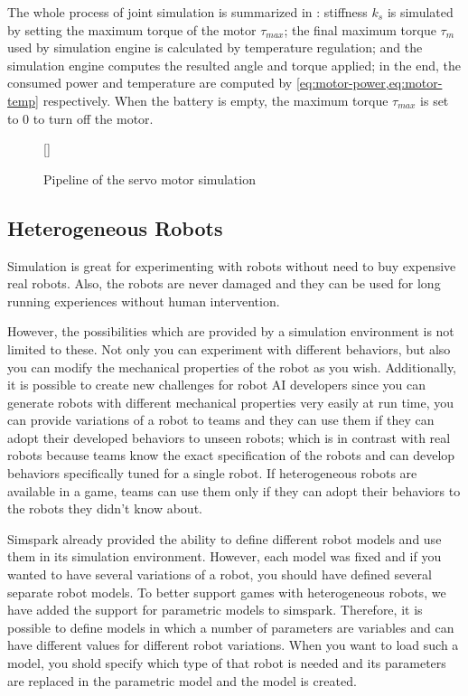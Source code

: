 \documentclass{llncs}
\newcommand{\inputtikz}[1]
{
  \StrSubstitute{#1}{/}{.}[\fn]
  \scancs{\filename}{\fn}
  \tikzsetfigurename{\filename}
  
}
\begin{document}
The whole process of joint simulation is summarized in
: stiffness $k_s$ is simulated by setting the maximum torque
of the motor $\tau_{max}$; the final maximum torque $\tau_m$ used by simulation engine is calculated by temperature regulation; and the simulation engine computes the resulted angle
and torque applied; in the end, the consumed power and temperature are
computed by \cref{eq:motor-power,eq:motor-temp} respectively. When the battery is empty, the maximum torque $\tau_{max}$ is set to 0 to turn off the motor.
\begin{figure}
  \centering
  \inputtikz{joint}
  \caption{Pipeline of the servo motor simulation}
  \label{fig:joint}
\end{figure}

\subsection{Heterogeneous Robots}
Simulation is great for experimenting with robots without need to buy expensive 
real robots. Also, the robots are never damaged and they can be used for long 
running experiences without human intervention. 

However, the possibilities which are provided by a simulation environment is 
not limited to these. Not only you can experiment with different behaviors, but
also you can modify the mechanical properties of the robot as you wish. Additionally,
it is possible to create new challenges for robot AI developers since you can
generate robots with different mechanical properties very easily at run time, 
you can provide variations of a robot to teams and they can use them if they can
adopt their developed behaviors to unseen robots; which is in contrast with 
real robots because teams know the exact specification of the robots and
can develop behaviors specifically tuned for a single robot. If heterogeneous 
robots are available in a game, teams can use them only if they can adopt
their behaviors to the robots they didn't know about.

Simspark already provided the ability to define different robot models and 
use them in its simulation environment. However, each model was fixed and if you
wanted to have several variations of a robot, you should have defined several 
separate robot models. To better support games with heterogeneous robots, we have
added the support for parametric models to simspark. Therefore, it is possible to
define models in which a number of parameters are variables and can have different
values for different robot variations. When you want to load such a model, you shold 
specify which type of that robot is needed and its parameters are replaced in the
parametric model and the model is created. 
\end{document}
